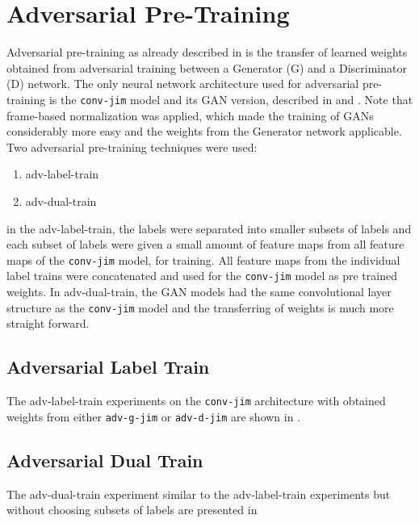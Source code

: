 
\section{Adversarial Pre-Training}\label{sec:exp_adv}
\thesisStateNotReady
Adversarial pre-training as already described in  is the transfer of learned weights obtained from adversarial training between a Generator (G) and a Discriminator (D) network.
The only neural network architecture used for adversarial pre-training is the \texttt{conv-jim} model and its GAN version, described in  and .
Note that frame-based normalization was applied, which made the training of GANs considerably more easy and the weights from the Generator network applicable.
Two adversarial pre-training techniques were used:
\begin{enumerate}
  \item adv-label-train 
  \item adv-dual-train
\end{enumerate}
in the adv-label-train, the labels were separated into smaller subsets of labels and each subset of labels were given a small amount of feature maps from all feature maps of the \texttt{conv-jim} model, for training. 
All feature maps from the individual label trains were concatenated and used for the \texttt{conv-jim} model as pre trained weights.
In adv-dual-train, the GAN models had the same convolutional layer structure as the \texttt{conv-jim} model and the transferring of weights is much more straight forward.



\subsection{Adversarial Label Train}
The adv-label-train experiments on the \texttt{conv-jim} architecture with obtained weights from either \texttt{adv-g-jim} or \texttt{adv-d-jim} are shown in .




\subsection{Adversarial Dual Train}
The adv-dual-train experiment similar to the adv-label-train experiments but without choosing subsets of labels are presented in 



